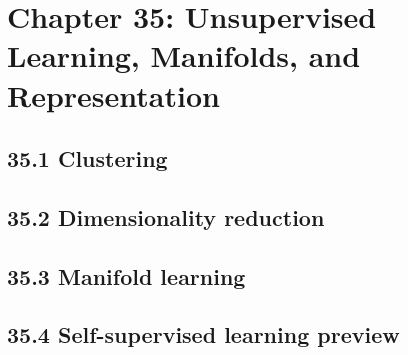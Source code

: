 \section{Chapter 35: Unsupervised Learning, Manifolds, and Representation}

\subsection{35.1 Clustering}

\subsection{35.2 Dimensionality reduction}

\subsection{35.3 Manifold learning}

\subsection{35.4 Self-supervised learning preview}

\clearpage
